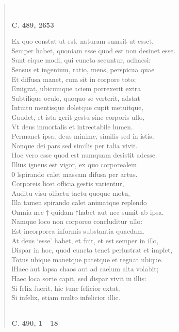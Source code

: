 \documentclass[11pt, a4paper]{report}
\begin{document}
\begin{verse}
        ﻿\pagebreak 
    \begin{center} \textbf{C. 489, 2653} \end{center} \marginpar{[45]} Ex quo constat ut est, naturam sumsit ut esset. \\ Semper habet, quoniam esse quod est non desinet esse. \\ Sunt eique modi, qui cuncta secuntur, adhaesi: \\ Sensus et ingenium, ratio, mens, perspicua quae \\ Et diffusa manet, cum sit in corpore toto; \\ Emigrat, ubicumque aciem porrexerit extra \\ Subtilique oculo, quoquo se verterit, adstat \\ Intuitu mentisque doletque cupit metuitque, \\ Gaudet, et ista gerit gestu sine corporis ullo, \\ Vt deus inmortalis et intrectabile lumen. \\ Permanet ipsa, deus minime, similis sed in istis, \\ Nonque dei pars sed similis per talia vivit. \\ Hoc vero esse quod est numquam desistit adesse. \\ Illius igneus est vigor, ex quo corporealem \\ 0 lspirando calet massam difusa per artus. \\ Corporeis licet oflicia gestis varientur, \\ Auditu visu olfactu tactu quoque motu, \\ Illa tamen spirando calet animatque replendo \\ Omnia nec † quidam †habet aut nec sumit ab ipsa. \\ Namque loco non corporeo concluditur ullo: \\ Est incorporea informis substantia quaedam. \\ At deus ‘esse’ habet, et fuit, et est semper in illo, \\ Dispar in hoc, quod cuncta tenet perlustrat et implet, \\ Totus ubique manetque patetque et regnat ubique. \\ lHaec aut lapsa chaos aut ad  \lbrack caelum \rbrack  alta volabit; \\ Haec loca sorte capit, sed dispar vivit in illis: \\ Si felix fuerit, hic tunc felicior extat, \\ Si infelix, etiam multo infelicior illic. \\ 
        ﻿\pagebreak 
     \marginpar{[46]} \begin{center} \textbf{C. 490, 1—18} \end{center}
      \end{verse}
  
\end{document}
